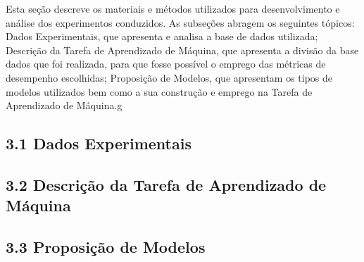 Esta seção descreve os materiais e métodos utilizados para desenvolvimento e análise dos experimentos conduzidos. As subseções abragem os seguintes tópicos: Dados Experimentais, que apresenta e analisa a base de dados utilizada; Descrição da Tarefa de Aprendizado de Máquina, que apresenta a divisão da base dados que foi realizada, para que fosse possível o emprego das métricas de desempenho escolhidas; Proposição de Modelos, que apresentam os tipos de modelos utilizados bem como a sua construção e emprego na Tarefa de Aprendizado de Máquina.g

\subsection{3.1 Dados Experimentais}


\subsection{3.2 Descrição da Tarefa de Aprendizado de Máquina}


\subsection{3.3 Proposição de Modelos}

